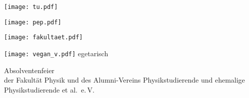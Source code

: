 \documentclass[paper=landscape]{scrartcl}
\begin{document}
\begin{minipage}{0.44\textwidth}%
  \texttt{[image: tu.pdf]}%
\end{minipage}%
\begin{minipage}{0.25\textwidth}%
  \centering
  \texttt{[image: pep.pdf]}%
\end{minipage}%
\begin{minipage}{0.29\textwidth}%
  \raggedleft%
  \texttt{[image: fakultaet.pdf]}%
\end{minipage}%

\vfill

\begin{center}
  \texttt{[image: vegan\_v.pdf]}%
  \fontsize{120}{140}\selectfont\hspace{-0.7em} egetarisch
\end{center}

\vfill

\begin{center}
  \huge Absolventenfeier\\
  der Fakultät Physik und des Alumni-Vereins
  Physikstudierende und ehemalige Physikstudierende et al.\ e.\,V.
\end{center}
  
\end{document}
